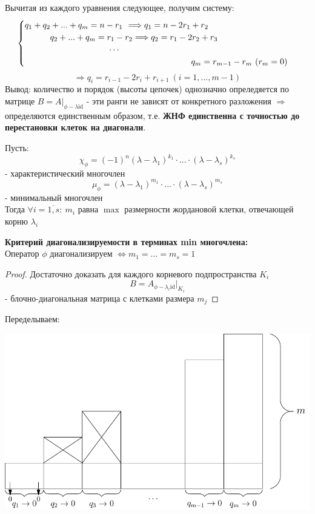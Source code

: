    Вычитая из каждого уравнения следующее, получим систему:
    $$\begin{cases}
        q_1 + q_2 + ... + q_m = n - r_1 \tab[0.13cm] \Longrightarrow q_1 = n - 2r_1 + r_2 \\
        \tab[1.05cm] q_2 + ... + q_m = r_1 - r_2 \Longrightarrow q_2 = r_1 - 2r_2 + r_3\\
        \tab[3.5cm]\cdots\\
        \tab[6.9cm]q_m = r_{m-1} - r_m \ (r_m = 0)
    \end{cases}$$
    $$\Longrightarrow q_i = r_{i-1} - 2r_i + r_{i+1} \ (i = 1,...,m-1)$$
    Вывод: количество и порядок (высоты цепочек) однозначно опреледяется по матрице $B=A|_{\phi-\lambda \text{id}}$ - эти ранги не зависят от конкретного разложения $\Longrightarrow$ определяются единственным образом, т.е. \textbf{ЖНФ единственна с точностью до перестановки клеток на диагонали}.
    \begin{consequense}
        Пусть: 
        $$\chi_\phi = (-1)^n(\lambda-\lambda_1)^{k_1}\cdot ... \cdot (\lambda-\lambda_s)^{k_s}$$
        - характеристический многочлен
        $$\mu_\phi = (\lambda-\lambda_1)^{m_1}\cdot ... \cdot (\lambda-\lambda_s)^{m_s}$$
        - минимальный многочлен\\
        Тогда $\forall i = \overline{1,s}: \ m_i$ равна $\max$ размерности жордановой клетки, отвечающей корню $\lambda_i$   
    \end{consequense}
    \begin{consequense}\textbf{ Критерий диагонализируемости в терминах min многочлена:} \\
        Оператор $\phi$ диагонализируем $\Longleftrightarrow m_1 = ... =m_s=1$  
    \end{consequense}
    \begin{proof}
        Достаточно доказать для каждого корневого подпространства $K_i$
        $$B = A_{\phi-\lambda_i \text{id}}|_{K_i}$$
        - блочно-диагональная матрица с клетками размера $m_j$   
    \end{proof} 
    Переделываем:
    \begin{center}
        \includegraphics[width=14cm]{image/Asymptote/2/linal-2-1.pdf}
    \end{center}
